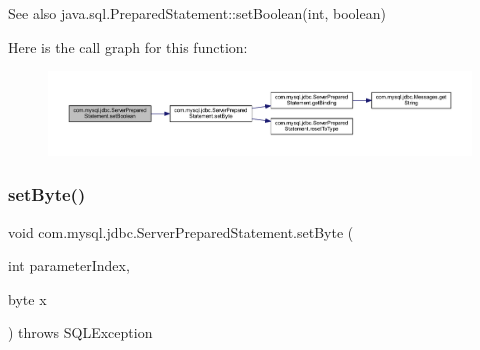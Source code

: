 \begin{DoxySeeAlso}{See also}
java.\+sql.\+Prepared\+Statement\+::set\+Boolean(int, boolean) 
\end{DoxySeeAlso}
Here is the call graph for this function\+:
\nopagebreak
\begin{figure}[H]
\begin{center}
\leavevmode
\includegraphics[width=350pt]{classcom_1_1mysql_1_1jdbc_1_1_server_prepared_statement_acabde4bf63d0f89240be8697087931c8_cgraph}
\end{center}
\end{figure}
\mbox{\label{classcom_1_1mysql_1_1jdbc_1_1_server_prepared_statement_aef5f55eba055a0061bef34a3a7bef005}} 
\subsubsection{\texorpdfstring{set\+Byte()}{setByte()}}
{\footnotesize\ttfamily void com.\+mysql.\+jdbc.\+Server\+Prepared\+Statement.\+set\+Byte (\begin{DoxyParamCaption}\item[{int}]{parameter\+Index,  }\item[{byte}]{x }\end{DoxyParamCaption}) throws S\+Q\+L\+Exception}

